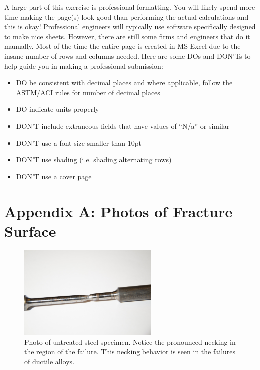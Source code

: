 \documentclass[12pt]{article}
\begin{document}
A large part of this exercise is professional formatting. You will likely spend more time making the page(s) look good than performing the actual calculations and this is okay! Professional engineers will typically use software specifically designed to make nice sheets. However, there are still some firms and engineers that do it manually. Most of the time the entire page is created in MS Excel due to the insane number of rows and columns needed. Here are some DOs and DON'Ts to help guide you in making a professional submission:

\begin{itemize}
    \item DO be consistent with decimal places and where applicable, follow the ASTM/ACI rules for number of decimal places
    \item DO indicate units properly
    \item DON'T include extraneous fields that have values of ``N/a'' or similar
    \item DON'T use a font size smaller than 10pt
    \item DON'T use shading (i.e. shading alternating rows)
    \item DON'T use a cover page
\end{itemize}

%
%

\pagebreak
\section*{Appendix A: Photos of Fracture Surface}
\label{AppendixA}

\renewcommand\thefigure{A\arabic{figure}}
\setcounter{figure}{0}


\begin{figure}[h]
    \centering
    \includegraphics[width=0.6\textwidth]{ST-4.jpg}
    \caption{Photo of untreated steel specimen. Notice the pronounced necking in the region of the failure. This necking behavior is seen in the failures of ductile alloys.}
    \label{fig:app1}
\end{figure}
\end{document}
